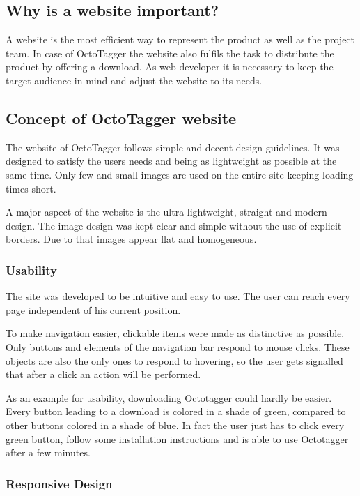 \subsection{Why is a website important?}

A website is the most efficient way to represent the product as well as the project team. In case of OctoTagger the website also fulfils the task to distribute the product by offering a download. As web developer it is necessary to keep the target audience in mind and adjust the website to its needs.

\subsection{Concept of OctoTagger website}

The website of OctoTagger follows simple and decent design guidelines. It was designed to satisfy the users needs and being as lightweight as possible at the same time. Only few and small images are used on the entire site keeping loading times short.

A major aspect of the website is the ultra-lightweight, straight and modern design. The image design was kept clear and simple without the use of explicit borders. Due to that images appear flat and homogeneous.

\subsubsection{Usability}

The site was developed to be intuitive and easy to use. The user can reach every page independent of his current position.

To make navigation easier, clickable items were made as distinctive as possible. Only buttons and elements of the navigation bar respond to mouse clicks. These objects are also the only ones to respond to hovering, so the user gets signalled that after a click an action will be performed.

As an example for usability, downloading Octotagger could hardly be easier. Every button leading to a download is colored in a shade of green, compared to other buttons colored in a shade of blue. In fact the user just has to click every green button, follow some installation instructions and is able to use Octotagger after a few minutes.

\subsubsection{Responsive Design}

